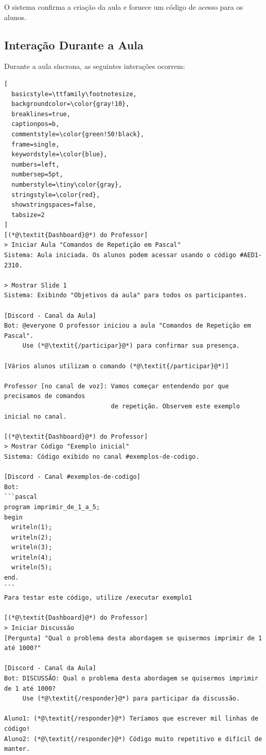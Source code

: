 O sistema confirma a criação da aula e fornece um código de acesso para os alunos.

\subsection{Interação Durante a Aula}
\label{subsec:interacao}

Durante a aula síncrona, as seguintes interações ocorrem:

\begin{lstlisting}[
  basicstyle=\ttfamily\footnotesize,
  backgroundcolor=\color{gray!10},
  breaklines=true,
  captionpos=b,
  commentstyle=\color{green!50!black},
  frame=single,
  keywordstyle=\color{blue},
  numbers=left,
  numbersep=5pt,
  numberstyle=\tiny\color{gray},
  stringstyle=\color{red},
  showstringspaces=false,
  tabsize=2
]
[(*@\textit{Dashboard}@*) do Professor]
> Iniciar Aula "Comandos de Repetição em Pascal"
Sistema: Aula iniciada. Os alunos podem acessar usando o código #AED1-2310.

> Mostrar Slide 1
Sistema: Exibindo "Objetivos da aula" para todos os participantes.

[Discord - Canal da Aula]
Bot: @everyone O professor iniciou a aula "Comandos de Repetição em Pascal". 
     Use (*@\textit{/participar}@*) para confirmar sua presença.

[Vários alunos utilizam o comando (*@\textit{/participar}@*)]

Professor [no canal de voz]: Vamos começar entendendo por que precisamos de comandos 
                             de repetição. Observem este exemplo inicial no canal.

[(*@\textit{Dashboard}@*) do Professor]
> Mostrar Código "Exemplo inicial"
Sistema: Código exibido no canal #exemplos-de-codigo.

[Discord - Canal #exemplos-de-codigo]
Bot: 
```pascal
program imprimir_de_1_a_5;
begin
  writeln(1);
  writeln(2);
  writeln(3);
  writeln(4);
  writeln(5);
end.
```
Para testar este código, utilize /executar exemplo1

[(*@\textit{Dashboard}@*) do Professor]
> Iniciar Discussão
[Pergunta] "Qual o problema desta abordagem se quisermos imprimir de 1 até 1000?"

[Discord - Canal da Aula]
Bot: DISCUSSÃO: Qual o problema desta abordagem se quisermos imprimir de 1 até 1000?
     Use (*@\textit{/responder}@*) para participar da discussão.

Aluno1: (*@\textit{/responder}@*) Teríamos que escrever mil linhas de código!
Aluno2: (*@\textit{/responder}@*) Código muito repetitivo e difícil de manter.


\end{lstlisting}
